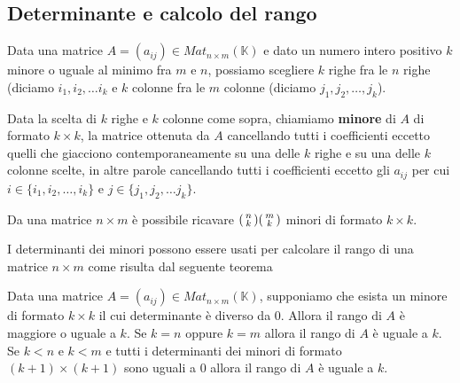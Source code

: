 
\subsection{Determinante e calcolo del rango}
Data una matrice $A = (a_{ij}) \in Mat_{n \times m}(\mathbb{K})$ e dato un
numero intero positivo $k$ minore o uguale al minimo fra $m$ e $n$, possiamo
scegliere $k$ righe fra le $n$ righe (diciamo $i_1, i_2, \dots i_k$ e
$k$ colonne fra le $m$ colonne (diciamo $j_1, j_2, \dots, j_k$).

\begin{defn}
	Data la scelta di $k$ righe e $k$ colonne come sopra, chiamiamo
	\textbf{minore} di $A$ di formato $k \times k$, la matrice ottenuta da $A$
	cancellando tutti i coefficienti eccetto quelli che giacciono
	contemporaneamente su una delle $k$ righe e su una delle $k$ colonne scelte,
	in altre parole cancellando tutti i coefficienti eccetto gli $a_{ij}$ per
	cui $i \in \{i_1, i_2, \dots, i_k\}$ e $j \in \{j_1, j_2, \dots j_k\}$.
\end{defn}

\begin{observation}
	Da una matrice $n \times m$ \`e possibile ricavare $\begin{psmallmatrix}
			n \\ k \end{psmallmatrix} \begin{psmallmatrix}
			m \\ k \end{psmallmatrix}$ minori di formato $k \times k$.
\end{observation}

I determinanti dei minori possono essere usati per calcolare il rango di una
matrice $n \times m$ come risulta dal seguente teorema

\begin{theorem}
	Data una matrice $A = (a_{ij}) \in Mat_{n \times m}(\mathbb{K})$, supponiamo
	che esista un minore di formato $k \times k$ il cui determinante \`e diverso
	da 0. Allora il rango di $A$ \`e maggiore o uguale a $k$. Se $k = n$ oppure
	$k = m$ allora il rango di $A$ \`e uguale a $k$. Se $k < n$ e $k < m$ e tutti
	i determinanti dei minori di formato $(k + 1) \times (k + 1)$ sono uguali a 0
	allora il rango di $A$ \`e uguale a $k$.
\end{theorem}

